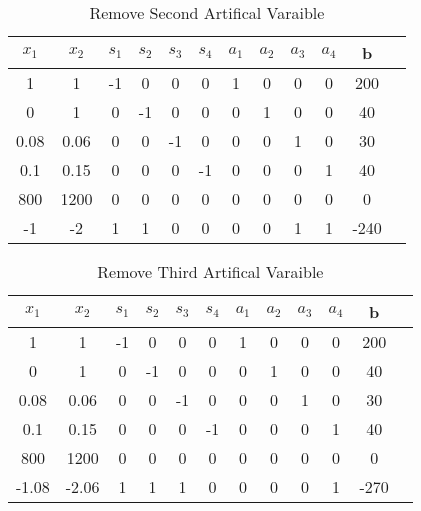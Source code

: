 \documentclass{article}
\begin{document}
  \begin{table}[H]
  \centering
  \caption{Remove Second Artifical Varaible}
  \label{my-label}
  \begin{tabular}{|c|c|c|c|c|c|c|c|c|c|c|c|}
  \hline
  $x_1$ & $x_2$ & $s_1$  & $s_2$ & $s_3$ & $s_4$ & $a_1$ & $a_2$ & $a_3$ & $a_4$ & b  \\ \hline
  1    & 1    & -1       & 0    & 0    & 0    & 1    & 0    & 0    & 0 & 200 \\ \hline
  0    & 1    & 0        & -1   & 0    & 0    & 0    & 1    & 0    & 0 & 40  \\ \hline
  0.08 & 0.06 & 0        & 0    & -1   & 0    & 0    & 0    & 1    & 0 & 30  \\ \hline
  0.1  & 0.15 & 0        & 0    & 0    & -1   & 0    & 0    & 0    & 1 & 40  \\ \hline
  800  & 1200 & 0        & 0    & 0    & 0    & 0    & 0    & 0    & 0 & 0   \\ \hline
  -1   & -2   & 1        & 1    & 0    & 0    & 0    & 0    & 1    & 1 & -240    \\ \hline
  \end{tabular}
  \end{table}

  \begin{table}[H]
  \centering
  \caption{Remove Third Artifical Varaible}
  \label{my-label}
  \begin{tabular}{|c|c|c|c|c|c|c|c|c|c|c|c|}
  \hline
  $x_1$ & $x_2$ & $s_1$  & $s_2$ & $s_3$ & $s_4$ & $a_1$ & $a_2$ & $a_3$ & $a_4$ & b  \\ \hline
  1    & 1    & -1       & 0    & 0    & 0    & 1    & 0    & 0    & 0 & 200 \\ \hline
  0    & 1    & 0        & -1   & 0    & 0    & 0    & 1    & 0    & 0 & 40  \\ \hline
  0.08 & 0.06 & 0        & 0    & -1   & 0    & 0    & 0    & 1    & 0 & 30  \\ \hline
  0.1  & 0.15 & 0        & 0    & 0    & -1   & 0    & 0    & 0    & 1 & 40  \\ \hline
  800  & 1200 & 0        & 0    & 0    & 0    & 0    & 0    & 0    & 0 & 0   \\ \hline
  -1.08 & -2.06  & 1     & 1    & 1    & 0    & 0    & 0    & 0    & 1 & -270   \\ \hline
  \end{tabular}
  \end{table}
\end{document}
